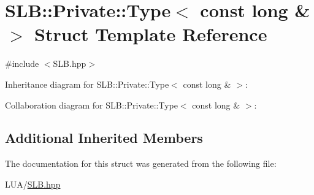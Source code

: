 \hypertarget{structSLB_1_1Private_1_1Type_3_01const_01long_01_6_01_4}{}\section{S\+LB\+:\+:Private\+:\+:Type$<$ const long \& $>$ Struct Template Reference}
\label{structSLB_1_1Private_1_1Type_3_01const_01long_01_6_01_4}


{\ttfamily \#include $<$S\+L\+B.\+hpp$>$}



Inheritance diagram for S\+LB\+:\+:Private\+:\+:Type$<$ const long \& $>$\+:


Collaboration diagram for S\+LB\+:\+:Private\+:\+:Type$<$ const long \& $>$\+:
\subsection*{Additional Inherited Members}


The documentation for this struct was generated from the following file\+:\begin{DoxyCompactItemize}
\item 
L\+U\+A/\hyperlink{SLB_8hpp}{S\+L\+B.\+hpp}\end{DoxyCompactItemize}
